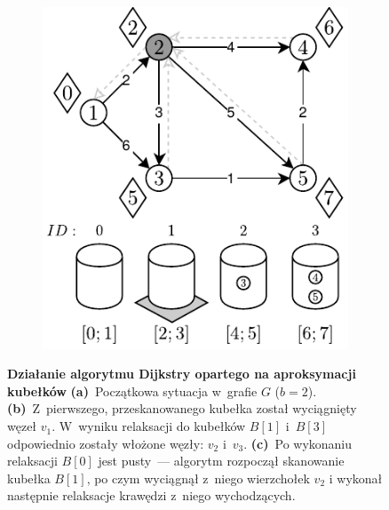 \begin{figure}[!htbp]
\begin{subfigure}[b]{0.27\textwidth}
		\caption{}
		\label{fig:exampleAproximateBuckets:b}
	\end{subfigure}
	\hfill
	\begin{subfigure}[b]{0.27\textwidth}
		\includegraphics[width=\textwidth]{Chapter_II/APROXIMATE-BUCKETS-Example/c.pdf}
		\caption{}
		\label{fig:exampleAproximateBuckets:c}
	\end{subfigure}
	\hfill\null
	\caption{
		\textbf{Działanie algorytmu Dijkstry opartego na aproksymacji kubełków}
		\textbf{(a)}~Początkowa sytuacja w~grafie $G$ ($b=2$).
		\textbf{(b)}~Z~pierwszego, przeskanowanego kubełka został wyciągnięty węzeł $v_{1}$.
		W~wyniku relaksacji do kubełków $B \left[ 1 \right]$ i~$B \left[ 3 \right]$ odpowiednio zostały włożone węzły: $v_{2}$ i~$v_{3}$.
		\textbf{(c)}~Po wykonaniu relaksacji $B \left[ 0 \right]$ jest pusty~--- algorytm rozpoczął skanowanie kubełka $B \left[ 1 \right]$, po czym wyciągnął z~niego wierzchołek $v_{2}$ i wykonał następnie relaksacje krawędzi z~niego wychodzących.
	}
	\label{fig:exampleAproximateBucketsA}
\end{figure}

